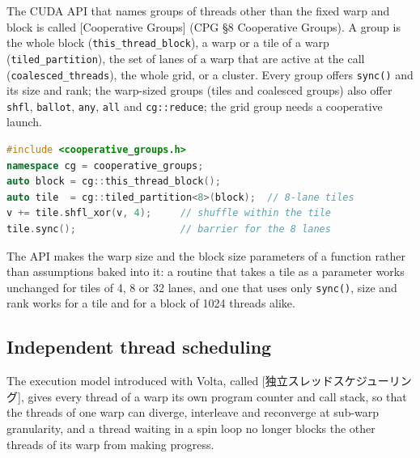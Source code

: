 \documentclass[../main.tex]{subfiles}
\begin{document}
\begin{definition}
  The CUDA API that names groups of threads other than the fixed warp
  and block is called [Cooperative Groups] (CPG
  §8 Cooperative Groups).  A group is the whole block
  (\texttt{this\_thread\_block}), a warp or a tile of a warp
  (\texttt{tiled\_partition}), the set of lanes of a warp that are
  active at the call (\texttt{coalesced\_threads}), the whole grid, or a
  cluster.  Every
  group offers \texttt{sync()} and its size and rank; the warp-sized
  groups (tiles and coalesced groups) also offer \texttt{shfl},
  \texttt{ballot}, \texttt{any}, \texttt{all} and \texttt{cg::reduce};
  the grid group needs a cooperative launch.
\end{definition}

\begin{lstlisting}[language=C++, numbers=none]
#include <cooperative_groups.h>
namespace cg = cooperative_groups;
auto block = cg::this_thread_block();
auto tile  = cg::tiled_partition<8>(block);  // 8-lane tiles
v += tile.shfl_xor(v, 4);     // shuffle within the tile
tile.sync();                  // barrier for the 8 lanes
\end{lstlisting}
The API makes the warp size and the block size parameters of a function
rather than assumptions baked into it: a routine that takes a tile as
a parameter works unchanged for tiles of 4, 8 or 32 lanes, and one that
uses only \texttt{sync()}, size and rank works for a tile and for a
block of 1024 threads alike.

\subsection{Independent thread scheduling}

\begin{definition}
  The execution model introduced with Volta, called
  [独立スレッドスケジューリング],
  gives every thread of a warp its own program
  counter and call stack, so that the threads of one warp can diverge,
  interleave and reconverge at sub-warp granularity, and a thread
  waiting in a spin loop no longer blocks the other threads of its warp
  from making progress.
\end{definition}
\end{document}
